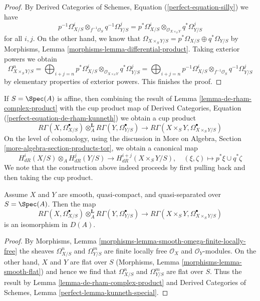 \begin{proof}
By Derived Categories of Schemes, Equation (\ref{perfect-equation-silly})
we have
$$
p^{-1}\Omega^i_{X/S} \otimes_{f^{-1}\mathcal{O}_S} q^{-1}\Omega^j_{Y/S} =
p^*\Omega^i_{X/S} \otimes_{\mathcal{O}_{X \times_S Y}} q^*\Omega^j_{Y/S}
$$
for all $i, j$. On the other hand, we know that
$
\Omega_{X \times_S Y/S} = p^*\Omega_{X/S} \oplus q^*\Omega_{Y/S}
$
by Morphisms, Lemma \ref{morphisms-lemma-differential-product}.
Taking exterior powers we obtain
$$
\Omega^n_{X \times_S Y/S} =
\bigoplus\nolimits_{i + j = n}
p^*\Omega^i_{X/S} \otimes_{\mathcal{O}_{X \times_S Y}} q^*\Omega^j_{Y/S} =
\bigoplus\nolimits_{i + j = n}
p^{-1}\Omega^i_{X/S} \otimes_{f^{-1}\mathcal{O}_S} q^{-1}\Omega^j_{Y/S}
$$
by elementary properties of exterior powers. This finishes the proof.
\end{proof}

\noindent
If $S = \Spec(A)$ is affine, then combining the result of
Lemma \ref{lemma-de-rham-complex-product} with the cup product map of
Derived Categories, Equation (\ref{perfect-equation-de-rham-kunneth})
we obtain a cup product
$$
R\Gamma(X, \Omega^\bullet_{X/S})
\otimes_A^\mathbf{L}
R\Gamma(Y, \Omega^\bullet_{Y/S})
\longrightarrow
R\Gamma(X \times_S Y, \Omega^\bullet_{X \times_S Y/S})
$$
On the level of cohomology, using the discussion in
More on Algebra, Section \ref{more-algebra-section-products-tor},
we obtain a canonical map
$$
H^i_{dR}(X/S) \otimes_A H^j_{dR}(Y/S)
\longrightarrow
H^{i + j}_{dR}(X \times_S Y/S),\quad
(\xi, \zeta) \longmapsto p^*\xi \cup q^*\zeta
$$
We note that the construction above indeed proceeds by
first pulling back and then taking the cup product.

\begin{lemma}
\label{lemma-kunneth-de-rham}
Assume $X$ and $Y$ are smooth, quasi-compact, and quasi-separated over
$S = \Spec(A)$. Then the map
$$
R\Gamma(X, \Omega^\bullet_{X/S})
\otimes_A^\mathbf{L}
R\Gamma(Y, \Omega^\bullet_{Y/S})
\longrightarrow
R\Gamma(X \times_S Y, \Omega^\bullet_{X \times_S Y/S})
$$
is an isomorphism in $D(A)$.
\end{lemma}

\begin{proof}
By Morphisms, Lemma \ref{morphisms-lemma-smooth-omega-finite-locally-free}
the sheaves $\Omega^n_{X/S}$ and $\Omega^m_{Y/S}$ are finite locally free
$\mathcal{O}_X$ and $\mathcal{O}_Y$-modules. On the other hand, $X$ and $Y$
are flat over $S$ (Morphisms, Lemma \ref{morphisms-lemma-smooth-flat})
and hence we find that $\Omega^n_{X/S}$ and $\Omega^m_{Y/S}$ are flat over $S$.
Thus the result by
Lemma \ref{lemma-de-rham-complex-product} and
Derived Categories of Schemes, Lemma \ref{perfect-lemma-kunneth-special}.
\end{proof}

